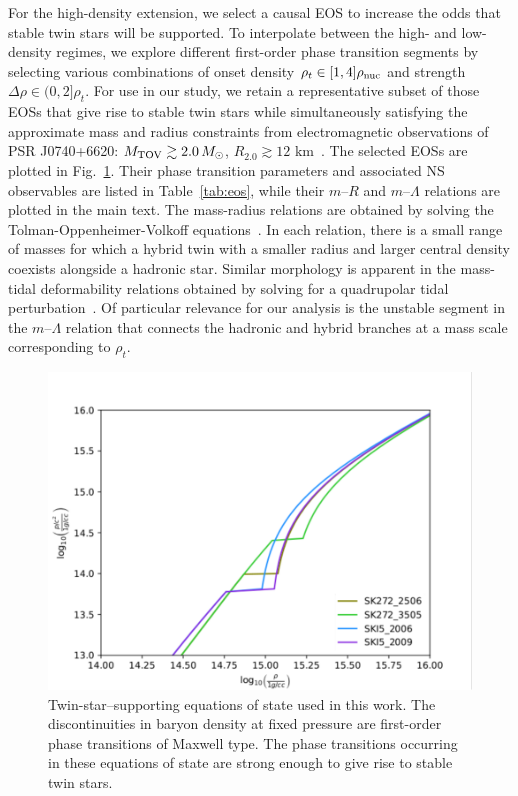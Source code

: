 \documentclass[aps,prl,twocolumn,superscriptaddress,footinbib]{revtex4-1}
\newcommand{\Msun}{\ensuremath{\,M_{\odot}}}
\begin{document}
For the high-density extension, we select a causal EOS to increase the odds that stable twin stars will be supported. To interpolate between the high- and low-density regimes, we explore different first-order phase transition segments by selecting various combinations of onset density $\rho_t \in [1, 4]\rho_{\rm nuc}$ and strength $\Delta\rho \in (0,2]\rho_t$. For use in our study, we retain a representative subset of those EOSs that give rise to stable twin stars while simultaneously satisfying the approximate mass and radius constraints from electromagnetic observations of PSR J0740+6620: $M_{\rm TOV} \gtrsim 2.0\Msun$, $R_{2.0} \gtrsim 12$ km~\cite{MillerLamb2021}. The selected EOSs are plotted in Fig.~\ref{fig:Eos_plot}. Their phase transition parameters and associated NS observables are listed in Table~\ref{tab:eos}, while their $m$--$R$ and $m$--$\Lambda$ relations are plotted in the main text. The mass-radius relations are obtained by solving the Tolman-Oppenheimer-Volkoff equations~\cite{OppenheimerVolkoff1939,Tolman1939}. In each relation, there is a small range of masses for which a hybrid twin with a smaller radius and larger central density coexists alongside a hadronic star. Similar morphology is apparent in the mass-tidal deformability relations obtained by solving for a quadrupolar tidal perturbation~\cite{FlanaganHinderer2008,Hinderer2008,LandryPoisson2014}. Of particular relevance for our analysis is the unstable segment in the $m$--$\Lambda$ relation that connects the hadronic and hybrid branches at a mass scale corresponding to $\rho_t$.

\begin{figure}[tb]
    \centering
    \includegraphics[width=0.9\columnwidth,trim={1 2 30 30},clip]{EoS.pdf}
    \caption{Twin-star--supporting equations of state used in this work. The discontinuities in baryon density at fixed pressure are first-order phase transitions of Maxwell type. The phase transitions occurring in these equations of state are strong enough to give rise to stable twin stars.}
    \label{fig:Eos_plot}
\end{figure}
\end{document}
